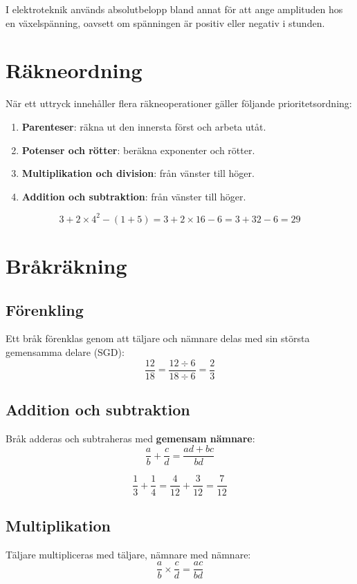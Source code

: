I elektroteknik används absolutbelopp bland annat för att ange amplituden hos en växelspänning,
oavsett om spänningen är positiv eller negativ i stunden.

\section{Räkneordning}
\label{c1:sec:rakneordning}
När ett uttryck innehåller flera räkneoperationer gäller följande prioritetsordning:
\begin{enumerate}
  \item \textbf{Parenteser}: räkna ut den innersta först och arbeta utåt.
  \item \textbf{Potenser och rötter}: beräkna exponenter och rötter.
  \item \textbf{Multiplikation och division}: från vänster till höger.
  \item \textbf{Addition och subtraktion}: från vänster till höger.
\end{enumerate}

\begin{exempel}
\[
  3 + 2 \times 4^2 - (1 + 5) = 3 + 2 \times 16 - 6 = 3 + 32 - 6 = 29
\]
\end{exempel}

\section{Bråkräkning}
\label{c1:sec:brak}

\subsection{Förenkling}
\label{c1:sec:forenkling}
Ett bråk förenklas genom att täljare och nämnare delas med sin största gemensamma delare (SGD):
\[
  \frac{12}{18} = \frac{12 \div 6}{18 \div 6} = \frac{2}{3}
\]

\subsection{Addition och subtraktion}
\label{c1:sec:bradd}
Bråk adderas och subtraheras med \textbf{gemensam nämnare}:
\[
  \frac{a}{b} + \frac{c}{d} = \frac{ad + bc}{bd}
\]

\begin{exempel}
\[
  \frac{1}{3} + \frac{1}{4} = \frac{4}{12} + \frac{3}{12} = \frac{7}{12}
\]
\end{exempel}

\subsection{Multiplikation}
\label{c1:sec:brmult}
Täljare multipliceras med täljare, nämnare med nämnare:
\[
  \frac{a}{b} \times \frac{c}{d} = \frac{ac}{bd}
\]

